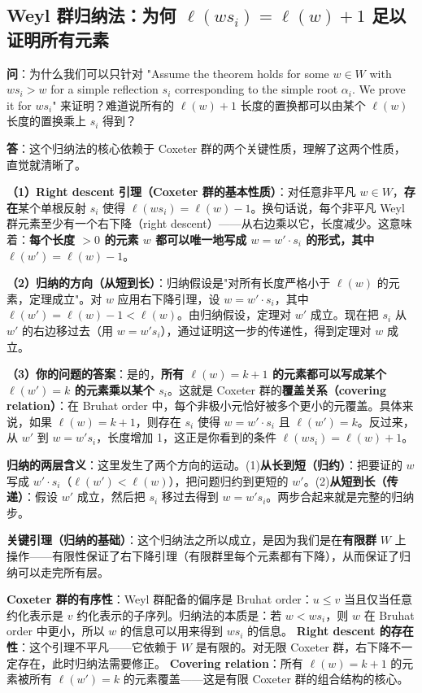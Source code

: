 \subsection{Weyl 群归纳法：为何 $\ell(ws_i) = \ell(w) + 1$ 足以证明所有元素}\label{sec:qa-weyl-induction}
\textbf{问}：为什么我们可以只针对 "Assume the theorem holds for some $w \in W$ with $ws_i > w$ for a simple reflection $s_i$ corresponding to the simple root $\alpha_i$. We prove it for $ws_i$" 来证明？难道说所有的 $\ell(w)+1$ 长度的置换都可以由某个 $\ell(w)$ 长度的置换乘上 $s_i$ 得到？

\textbf{答}：这个归纳法的核心依赖于 Coxeter 群的两个关键性质，理解了这两个性质，直觉就清晰了。

\textbf{（1）Right descent 引理（Coxeter 群的基本性质）}：对任意非平凡 $w \in W$，\textbf{存在}某个单根反射 $s_i$ 使得 $\ell(ws_i) = \ell(w) - 1$。换句话说，每个非平凡 Weyl 群元素至少有一个右下降（right descent）——从右边乘以它，长度减少。这意味着：\textbf{每个长度 $>0$ 的元素 $w$ 都可以唯一地写成 $w = w' \cdot s_i$ 的形式，其中 $\ell(w') = \ell(w) - 1$}。

\textbf{（2）归纳的方向（从短到长）}：归纳假设是"对所有长度严格小于 $\ell(w)$ 的元素，定理成立"。对 $w$ 应用右下降引理，设 $w = w' \cdot s_i$，其中 $\ell(w') = \ell(w) - 1 < \ell(w)$。由归纳假设，定理对 $w'$ 成立。现在把 $s_i$ 从 $w'$ 的右边移过去（用 $w = w's_i$），通过证明这一步的传递性，得到定理对 $w$ 成立。

\textbf{（3）你的问题的答案}：是的，\textbf{所有 $\ell(w) = k+1$ 的元素都可以写成某个 $\ell(w') = k$ 的元素乘以某个 $s_i$}。这就是 Coxeter 群的\textbf{覆盖关系（covering relation）}：在 Bruhat order 中，每个非极小元恰好被多个更小的元覆盖。具体来说，如果 $\ell(w) = k+1$，则存在 $s_i$ 使得 $w = w' \cdot s_i$ 且 $\ell(w') = k$。反过来，从 $w'$ 到 $w = w's_i$，长度增加 1，这正是你看到的条件 $\ell(ws_i) = \ell(w) + 1$。

\textbf{归纳的两层含义}：这里发生了两个方向的运动。(1)\textbf{从长到短（归约）}：把要证的 $w$ 写成 $w' \cdot s_i$（$\ell(w') < \ell(w)$），把问题归约到更短的 $w'$。(2)\textbf{从短到长（传递）}：假设 $w'$ 成立，然后把 $s_i$ 移过去得到 $w = w's_i$。两步合起来就是完整的归纳步。

\textbf{关键引理（归纳的基础）}：这个归纳法之所以成立，是因为我们是在\textbf{有限群} $W$ 上操作——有限性保证了右下降引理（有限群里每个元素都有下降），从而保证了归纳可以走完所有层。

\begin{insight}
\textbf{Coxeter 群的有序性}：Weyl 群配备的偏序是 Bruhat order：$u \leq v$ 当且仅当任意约化表示是 $v$ 约化表示的子序列。归纳法的本质是：若 $w < ws_i$，则 $w$ 在 Bruhat order 中更小，所以 $w$ 的信息可以用来得到 $ws_i$ 的信息。
\textbf{Right descent 的存在性}：这个引理不平凡——它依赖于 $W$ 是有限的。对无限 Coxeter 群，右下降不一定存在，此时归纳法需要修正。
\textbf{Covering relation}：所有 $\ell(w) = k+1$ 的元素被所有 $\ell(w') = k$ 的元素覆盖——这是有限 Coxeter 群的组合结构的核心。
\end{insight}


